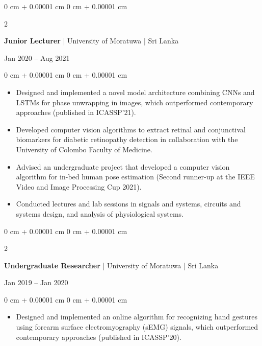 \documentclass[10pt, letterpaper]{article}
\newenvironment{highlights}{
    \begin{itemize}[
        topsep=0.10 cm,
        parsep=0.10 cm,
        partopsep=0pt,
        itemsep=0pt,
        leftmargin=0 cm + 10pt
    ]
}{
    \end{itemize}
} %
\newenvironment{onecolentry}{
    \begin{adjustwidth}{
        0 cm + 0.00001 cm
    }{
        0 cm + 0.00001 cm
    }
}{
    \end{adjustwidth}
} %
\newenvironment{twocolentry}[2][]{
    \onecolentry
    \def\secondColumn{#2}
    \setcolumnwidth{\fill, 4.5 cm}
    \begin{paracol}{2}
}{
    \switchcolumn \raggedleft \secondColumn
    \end{paracol}
    \endonecolentry
} %
\begin{document}
        \begin{twocolentry}{Jan 2020 – Aug 2021}
        \textbf{Junior Lecturer} | University of Moratuwa | Sri Lanka
        \end{twocolentry}
        \vspace{0.10 cm}
        \begin{onecolentry}
            \begin{highlights}
                \item Designed and implemented a novel model architecture combining CNNs and LSTMs for phase unwrapping in images, which outperformed contemporary approaches (published in ICASSP'21).
                \item Developed computer vision algorithms to extract retinal and conjunctival biomarkers for diabetic retinopathy detection in collaboration with the University of Colombo Faculty of Medicine.
                \item Advised an undergraduate project that developed a computer vision algorithm for in-bed human pose estimation (Second runner-up at the IEEE Video and Image Processing Cup 2021).
                \item Conducted lectures and lab sessions in signals and systems, circuits and systems design, and analysis of physiological systems.
            \end{highlights}
        \end{onecolentry}

        \vspace{0.2 cm}

        \begin{twocolentry}{Jan 2019 – Jan 2020}
        \textbf{Undergraduate Researcher} | University of Moratuwa | Sri Lanka
        \end{twocolentry}
        \vspace{0.10 cm}
        \begin{onecolentry}
            \begin{highlights}
                \item Designed and implemented an online algorithm for recognizing hand gestures using forearm surface electromyography (sEMG) signals, which outperformed contemporary approaches (published in ICASSP'20).
            \end{highlights}
        \end{onecolentry}
\end{document}
